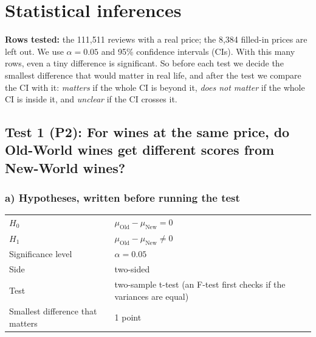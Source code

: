 \documentclass[10pt,a4paper,twocolumn]{article}
\newif\ifshowhints
\newcommand{\hint}[1]{\ifshowhints\par{\color{gray}\itshape\small #1\par}\fi}
\begin{document}
\section{Statistical inferences}
\hint{Conduct 3--5 hypothesis tests on your problem statement(s), each with parts a)--c) below. Know your tests and the
reason for using them, and compare them with other tests.}

\textbf{Rows tested:} the 111,511 reviews with a real price; the 8,384 filled-in prices are left out. We use
$\alpha = 0.05$ and 95\% confidence intervals (CIs). With this many rows, even a tiny difference is significant. So
before each test we decide the smallest difference that would matter in real life, and after the test we compare the CI
with it: \emph{matters} if the whole CI is beyond it, \emph{does not matter} if the whole CI is inside it, and
\emph{unclear} if the CI crosses it.

\subsection*{Test 1 (P2): For wines at the same price, do Old-World wines get different scores from New-World wines?}

\subsubsection*{a) Hypotheses, written before running the test}
\hint{Before running the test, write the null and alternative hypotheses ($H_0$ carries the equality), the
significance level, one- or two-sided, the test you will use, and the smallest difference that would matter in the
real world.}
{\small
\begin{tabularx}{\columnwidth}{@{}HL@{}}
\toprule
$H_0$ & $\mu_{\text{Old}} - \mu_{\text{New}} = 0$\\
$H_1$ & $\mu_{\text{Old}} - \mu_{\text{New}} \neq 0$\\
Significance level & $\alpha = 0.05$\\
Side & two-sided\\
Test & two-sample t-test (an F-test first checks if the variances are equal)\\
Smallest difference that matters & 1 point\\
\bottomrule
\end{tabularx}\par}
\end{document}

